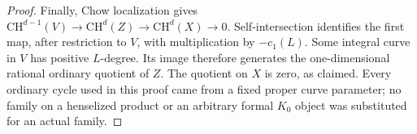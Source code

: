\begin{proof}
Finally, Chow localization gives
$\mathrm{CH}^{d-1}(V)\to\mathrm{CH}^d(Z)\to\mathrm{CH}^d(X)\to0$.
Self-intersection identifies the first map, after restriction to
$V$, with multiplication by $-c_1(L)$. Some integral curve in
$V$ has positive $L$-degree. Its image therefore generates the
one-dimensional rational ordinary quotient of $Z$.
The quotient on $X$ is zero, as claimed. Every ordinary cycle
used in this proof came from a fixed proper curve parameter;
no family on a henselized product or an arbitrary formal
$K_0$ object was substituted for an actual family.
\end{proof}
